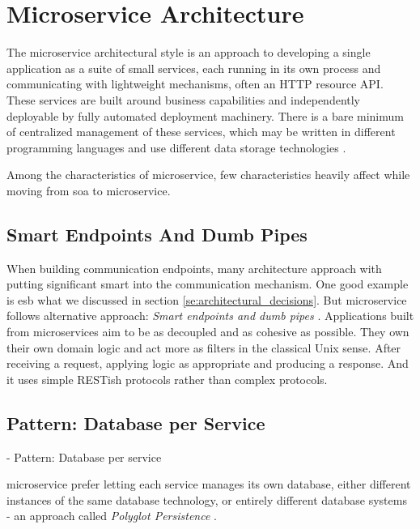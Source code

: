 \section{Microservice Architecture}

The microservice architectural style is an approach to developing a single application as a suite of small services, each running in its own process and communicating with lightweight mechanisms, often an HTTP resource API. These services are built around business capabilities and independently deployable by fully automated deployment machinery. There is a bare minimum of centralized management of these services, which may be written in different programming languages and use different data storage technologies \cite{LewisMicroservices}.

Among the characteristics of \acrfull{microservice}, few characteristics heavily affect while moving from \acrshort{soa} to \acrshort{microservice}.
\subsection{Smart Endpoints And Dumb Pipes}
\label{subse:smart_endpoints}
When building communication endpoints, many architecture approach with putting significant smart into the communication mechanism. One good example is \acrshort{esb} what we discussed in section \ref{se:architectural_decisions}. But microservice follows alternative approach: \emph{Smart endpoints and dumb pipes} \cite{LewisMicroservicesPipes}.
Applications built from microservices aim to be as decoupled and as cohesive as possible. They own their own domain logic and act more as filters in the classical Unix sense. After receiving a request, applying logic as appropriate and producing a response. And it uses simple RESTish protocols rather than complex protocols.

\subsection{Pattern: Database per Service}
\label{subse:database_per_service}
- Pattern: Database per service 

\acrshort{microservice} prefer letting each service manages its own database, either different instances of the same database technology, or entirely different database systems - an approach called \emph{Polyglot Persistence} \cite{LewisMicroservicesManagement}.

